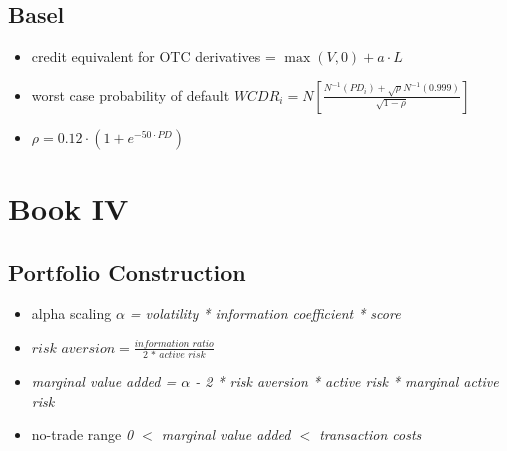 \subsection{Basel}
\begin{itemize}
	\item credit equivalent for OTC derivatives = $\max(V, 0) + a \cdot L$
	\item worst case probability of default $WCDR_i = N\left[\frac{N^{-1}(PD_i) + \sqrt{\rho} N^{-1}(0.999)}{\sqrt{1 - \rho}}\right]$
	\item $\rho = 0.12 \cdot (1 + e^{-50 \cdot PD})$
\end{itemize}

\section{Book IV}

\subsection{Portfolio Construction}
\begin{itemize}
	\item alpha scaling \textit{$\alpha$ = volatility * information coefficient * score}
	\item $\textit{risk aversion} = \frac{\textit{information ratio}}{\textit{2 * active risk}}$
	\item \textit{marginal value added = $\alpha$ - 2 * risk aversion * active risk * marginal active risk}
	\item no-trade range \textit{0 $<$ marginal value added $<$ transaction costs}
\end{itemize}


